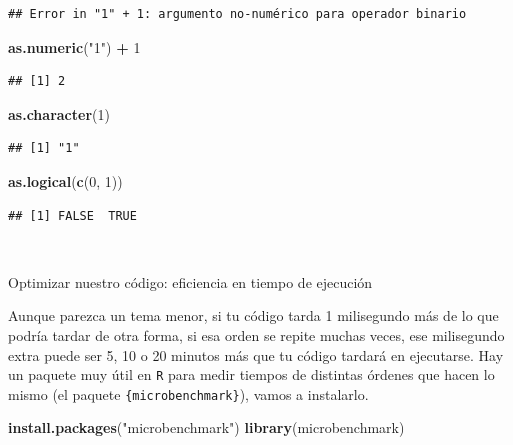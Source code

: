 \documentclass[11pt,]{book}
\newenvironment{Shaded}{\begin{snugshade}}{\end{snugshade}}
\newcommand{\DecValTok}[1]{\textcolor[rgb]{0.06,0.06,0.06}{#1}}
\newcommand{\KeywordTok}[1]{\textcolor[rgb]{0.27,0.27,0.27}{\textbf{#1}}}
\newcommand{\NormalTok}[1]{#1}
\newcommand{\OperatorTok}[1]{\textcolor[rgb]{0.43,0.43,0.43}{\textbf{#1}}}
\newcommand{\StringTok}[1]{\textcolor[rgb]{0.5,0.5,0.5}{#1}}
\begin{document}
\begin{verbatim}
## Error in "1" + 1: argumento no-numérico para operador binario
\end{verbatim}

\begin{Shaded}
\begin{Highlighting}[]
\KeywordTok{as.numeric}\NormalTok{(}\StringTok{"1"}\NormalTok{) }\OperatorTok{+}\StringTok{ }\DecValTok{1}
\end{Highlighting}
\end{Shaded}

\begin{verbatim}
## [1] 2
\end{verbatim}

\begin{Shaded}
\begin{Highlighting}[]
\KeywordTok{as.character}\NormalTok{(}\DecValTok{1}\NormalTok{)}
\end{Highlighting}
\end{Shaded}

\begin{verbatim}
## [1] "1"
\end{verbatim}

\begin{Shaded}
\begin{Highlighting}[]
\KeywordTok{as.logical}\NormalTok{(}\KeywordTok{c}\NormalTok{(}\DecValTok{0}\NormalTok{, }\DecValTok{1}\NormalTok{))}
\end{Highlighting}
\end{Shaded}

\begin{verbatim}
## [1] FALSE  TRUE
\end{verbatim}

~

Optimizar nuestro código: eficiencia en tiempo de ejecución

Aunque parezca un tema menor, si tu código tarda 1 milisegundo más de lo que podría tardar de otra forma, si esa orden se repite muchas veces, ese milisegundo extra puede ser 5, 10 o 20 minutos más que tu código tardará en ejecutarse. Hay un paquete muy útil en \texttt{R} para medir tiempos de distintas órdenes que hacen lo mismo (el paquete \texttt{\{microbenchmark\}}), vamos a instalarlo.

\begin{Shaded}
\begin{Highlighting}[]
\KeywordTok{install.packages}\NormalTok{(}\StringTok{"microbenchmark"}\NormalTok{)}
\KeywordTok{library}\NormalTok{(microbenchmark)}
\end{Highlighting}
\end{Shaded}
\end{document}
